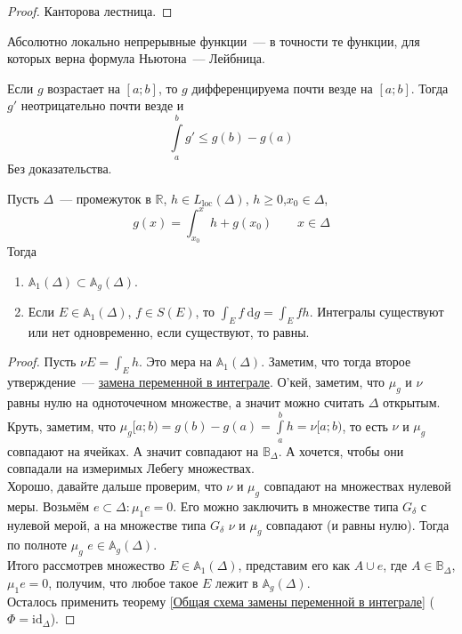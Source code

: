 \documentclass{article}
\begin{document}
    \begin{proof}
        Канторова лестница.
    \end{proof}
    \begin{remark}
        Абсолютно локально непрерывные функции~--- в точности те функции, для которых верна формула Ньютона~--- Лейбница.
    \end{remark}
    \begin{claim}
        Если $g$ возрастает на $[a;b]$, то $g$ дифференцируема почти везде на $[a;b]$. Тогда $g'$ неотрицательно почти везде и
        $$
        \int\limits_a^bg'\leqslant g(b)-g(a)
        $$
        Без доказательства.
    \end{claim}
    \begin{theorem}
        \label{Интеграл Лебега~--- Стилтьеса абсолютно локально непрерывной функции}
        Пусть $\Delta$~--- промежуток в $\mathbb R$, $h\in L_{\mathrm{loc}}(\Delta)$, $h\geqslant0$,$x_0\in\Delta$,
        $$
        g(x)=\int_{x_0}^xh+g(x_0)\qquad x\in\Delta
        $$
        Тогда
        \begin{enumerate}
            \item $\mathbb A_1(\Delta)\subset\mathbb A_g(\Delta)$.
            \item Если $E\in\mathbb A_1(\Delta)$, $f\in S(E)$, то $\int_Ef~\mathrm dg=\int_Efh$. Интегралы существуют или нет одновременно, если существуют, то равны.
        \end{enumerate}
    \end{theorem}
    \begin{proof}
        Пусть $\nu E=\int_Eh$. Это мера на $\mathbb A_1(\Delta)$. Заметим, что тогда второе утверждение~--- \hyperref[Общая схема замены переменной в интеграле]{замена переменной в интеграле}. О'кей, заметим, что $\mu_g$ и $\nu$ равны нулю на одноточечном множестве, а значит можно считать $\Delta$ открытым.\\
        Круть, заметим, что $\mu_g[a;b)=g(b)-g(a)=\int\limits_a^bh=\nu[a;b)$, то есть $\nu$ и $\mu_g$ совпадают на ячейках. А значит совпадают на $\mathbb B_\Delta$. А хочется, чтобы они совпадали на измеримых Лебегу множествах.\\
        Хорошо, давайте дальше проверим, что $\nu$ и $\mu_g$ совпадают на множествах нулевой меры. Возьмём $e\subset\Delta:\mu_1e=0$. Его можно заключить в множестве типа $G_\delta$ с нулевой мерой, а на множестве типа $G_\delta$ $\nu$ и $\mu_g$ совпадают (и равны нулю). Тогда по полноте $\mu_g$ $e\in\mathbb A_g(\Delta)$.\\
        Итого рассмотрев множество $E\in\mathbb A_1(\Delta)$, представим его как $A\cup e$, где $A\in\mathbb B_\Delta$, $\mu_1e=0$, получим, что любое такое $E$ лежит в $\mathbb A_g(\Delta)$.\\
        Осталось применить теорему \ref{Общая схема замены переменной в интеграле} ($\Phi=\mathrm{id}_\Delta$).
    \end{proof}
\end{document}
